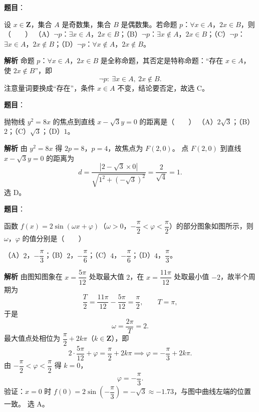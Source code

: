 \begin{answer}

\textbf{题目}：

设 $x\in\mathbf Z$，集合 $A$ 是奇数集，集合 $B$ 是偶数集。若命题 $p$：$\forall x\in A$，$2x\in B$，则\mbox{（　　）}
（A）$\neg p$：$\exists x\in A$，$2x\in B$；（B）$\neg p$：$\exists x\notin A$，$2x\in B$；（C）$\neg p$：$\exists x\in A$，$2x\notin B$；（D）$\neg p$：$\forall x\notin A$，$2x\notin B$。

\textbf{解析}
命题 $p$：$\forall x\in A$，$2x\in B$ 是全称命题，其否定是特称命题：“存在 $x\in A$，使 $2x\notin B$”，即
\nopagebreak[4]
\[\neg p:\ \exists x\in A,\ 2x\notin B.\]
注意量词要换成“存在”，条件 $x\in A$ 不变，结论要否定，故选 C。


\end{answer}
\begin{answer}

\textbf{题目}：

抛物线 $y^2=8x$ 的焦点到直线 $x-\sqrt3y=0$ 的距离是\mbox{（　　）}
（A）$2\sqrt3$；（B）$2$；（C）$\sqrt3$；（D）$1$。

\textbf{解析}
由 $y^2=8x$ 得 $2p=8$，$p=4$，故焦点为 $F(2,0)$。
点 $F(2,0)$ 到直线 $x-\sqrt3y=0$ 的距离为
\nopagebreak[4]
\[d=\frac{|2-\sqrt3\times0|}{\sqrt{1^2+(-\sqrt3)^2}}=\frac2{\sqrt4}=1.\]
选 D。


\end{answer}
\begin{answer}

\textbf{题目}：

函数 $f(x)=2\sin(\omega x+\varphi)$（$\omega>0$，$-\dfrac\pi2<\varphi<\dfrac\pi2$）的部分图象如图所示，则 $\omega$，$\varphi$ 的值分别是\mbox{（　　）}
\nopagebreak[4]
\begin{center}\end{center}
\nopagebreak[4]
（A）$2$，$-\dfrac\pi3$；（B）$2$，$-\dfrac\pi6$；（C）$4$，$-\dfrac\pi6$；（D）$4$，$\dfrac\pi3$。

\textbf{解析}
由图知图象在 $x=\dfrac{5\pi}{12}$ 处取最大值 $2$，在 $x=\dfrac{11\pi}{12}$ 处取最小值 $-2$，故半个周期为
\nopagebreak[4]
\[\frac T2=\frac{11\pi}{12}-\frac{5\pi}{12}=\frac\pi2,\qquad T=\pi,\]
于是
\nopagebreak[4]
\[\omega=\frac{2\pi}T=2.\]
最大值点处相位为 $\dfrac\pi2+2k\pi$（$k\in\mathbf Z$），即
\nopagebreak[4]
\[2\cdot\frac{5\pi}{12}+\varphi=\frac\pi2+2k\pi\implies\varphi=-\frac\pi3+2k\pi.\]
由 $-\dfrac\pi2<\varphi<\dfrac\pi2$ 得 $k=0$，
\nopagebreak[4]
\[\varphi=-\frac\pi3.\]
验证：$x=0$ 时 $f(0)=2\sin\left(-\dfrac\pi3\right)=-\sqrt3\approx-1.73$，与图中曲线左端的位置一致。
选 A。


\end{answer}
